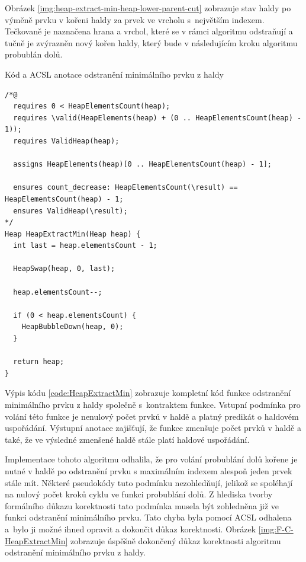 Obrázek \ref{img:heap-extract-min-heap-lower-parent-cut} zobrazuje stav haldy po výměně prvku v kořeni haldy za prvek ve vrcholu s~největším indexem. Tečkovaně je naznačena hrana a vrchol, které se v rámci algoritmu odstraňují a tučně je zvýrazněn nový kořen haldy, který bude v následujícím kroku algoritmu probublán dolů.

\begin{listing}[H]
	\caption{Kód a ACSL anotace odstranění minimálního prvku z haldy}
	\label{code:HeapExtractMin}
	\begin{verbatim}
/*@
  requires 0 < HeapElementsCount(heap);
  requires \valid(HeapElements(heap) + (0 .. HeapElementsCount(heap) - 1));
  requires ValidHeap(heap);

  assigns HeapElements(heap)[0 .. HeapElementsCount(heap) - 1];

  ensures count_decrease: HeapElementsCount(\result) == HeapElementsCount(heap) - 1;
  ensures ValidHeap(\result);
*/
Heap HeapExtractMin(Heap heap) {
  int last = heap.elementsCount - 1;

  HeapSwap(heap, 0, last);

  heap.elementsCount--;

  if (0 < heap.elementsCount) {
    HeapBubbleDown(heap, 0);
  }

  return heap;
}
	\end{verbatim}
\end{listing}

Výpis kódu \ref{code:HeapExtractMin} zobrazuje kompletní kód funkce odstranění minimálního prvku z haldy společně s~kontraktem funkce. Vstupní podmínka pro volání této funkce je nenulový počet prvků v haldě a platný predikát o haldovém uspořádání. Výstupní anotace zajišťují, že funkce zmenšuje počet prvků v haldě a také, že ve výsledné zmenšené haldě stále platí haldové uspořádání.

Implementace tohoto algoritmu odhalila, že pro volání probublání dolů kořene je nutné v haldě po odstranění prvku s maximálním indexem alespoň jeden prvek stále mít. Některé pseudokódy tuto podmínku nezohledňují, jelikož se spoléhají na nulový počet kroků cyklu ve funkci probublání dolů. \cite{Pruvodce2017} Z hlediska tvorby formálního důkazu korektnosti tato podmínka musela být zohledněna již ve funkci odstranění minimálního prvku. Tato chyba byla pomocí ACSL odhalena a~bylo ji možné ihned opravit a dokončit důkaz korektnosti. Obrázek \ref{img:F-C-HeapExtractMin} zobrazuje úspěšně dokončený důkaz korektnosti algoritmu odstranění minimálního prvku z haldy.


